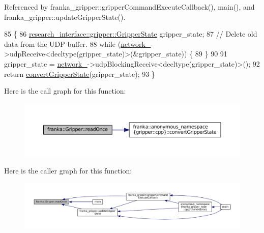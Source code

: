 Referenced by franka\+\_\+gripper\+::gripper\+Command\+Execute\+Callback(), main(), and franka\+\_\+gripper\+::update\+Gripper\+State().


\begin{DoxyCode}
85                                      \{
86   \hyperlink{structresearch__interface_1_1gripper_1_1GripperState}{research\_interface::gripper::GripperState} gripper\_state;
87   \textcolor{comment}{// Delete old data from the UDP buffer.}
88   \textcolor{keywordflow}{while} (\hyperlink{classfranka_1_1Gripper_a0d6702c45e61147da44b08dd757890df}{network\_}->udpReceive<decltype(gripper\_state)>(&gripper\_state)) \{
89   \}
90 
91   gripper\_state = \hyperlink{classfranka_1_1Gripper_a0d6702c45e61147da44b08dd757890df}{network\_}->udpBlockingReceive<decltype(gripper\_state)>();
92   \textcolor{keywordflow}{return} \hyperlink{namespacefranka_1_1anonymous__namespace_02gripper_8cpp_03_af656eaa1cbb4150840e47175fed828e8}{convertGripperState}(gripper\_state);
93 \}
\end{DoxyCode}
Here is the call graph for this function\+:
\nopagebreak
\begin{figure}[H]
\begin{center}
\leavevmode
\includegraphics[width=350pt]{classfranka_1_1Gripper_ab0afc8a41c9c5fff808e76851dcf23ce_cgraph}
\end{center}
\end{figure}
Here is the caller graph for this function\+:
\nopagebreak
\begin{figure}[H]
\begin{center}
\leavevmode
\includegraphics[width=350pt]{classfranka_1_1Gripper_ab0afc8a41c9c5fff808e76851dcf23ce_icgraph}
\end{center}
\end{figure}
\mbox{\label{classfranka_1_1Gripper_aa1b8386fd24408753362ee088d8f9a01}} 
